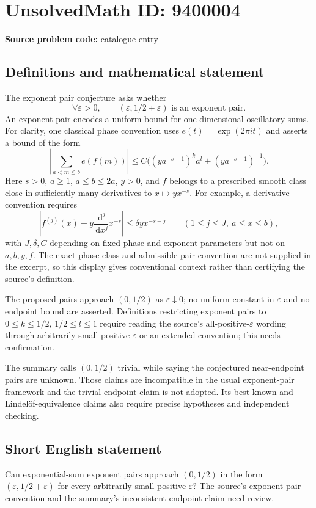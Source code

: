 \documentclass[11pt]{article}
\newcommand{\dd}{\,\mathrm{d}}
\begin{document}
\section*{UnsolvedMath ID: 9400004}
\textbf{Source problem code:} catalogue entry
\subsection{Definitions and mathematical statement}
The exponent pair conjecture asks whether
\[
 \forall\varepsilon>0,\qquad (\varepsilon,1/2+\varepsilon)
 \text{ is an exponent pair}.
\]
An exponent pair encodes a uniform bound for one-dimensional oscillatory sums. For clarity, one classical phase convention uses \(e(t)=\exp(2\pi i t)\) and asserts a bound of the form
\[
 \left|\sum_{a<m\leq b}e(f(m))\right|
 \leq C\bigl((ya^{-s-1})^k a^l+(ya^{-s-1})^{-1}\bigr).
\]
Here \(s>0\), \(a\geq1\), \(a\leq b\leq2a\), \(y>0\), and \(f\) belongs to a prescribed smooth class close in sufficiently many derivatives to \(x\mapsto yx^{-s}\). For example, a derivative convention requires
\[
 \left|f^{(j)}(x)-y\frac{\dd^j}{\dd x^j}x^{-s}\right|
 \leq\delta yx^{-s-j}\qquad(1\leq j\leq J,\ a\leq x\leq b),
\]
with \(J,\delta,C\) depending on fixed phase and exponent parameters but not on \(a,b,y,f\). The exact phase class and admissible-pair convention are not supplied in the excerpt, so this display gives conventional context rather than certifying the source's definition.

The proposed pairs approach \((0,1/2)\) as \(\varepsilon\downarrow0\); no uniform constant in \(\varepsilon\) and no endpoint bound are asserted. Definitions restricting exponent pairs to \(0\leq k\leq1/2\), \(1/2\leq l\leq1\) require reading the source's all-positive-\(\varepsilon\) wording through arbitrarily small positive \(\varepsilon\) or an extended convention; this needs confirmation.

The summary calls \((0,1/2)\) trivial while saying the conjectured near-endpoint pairs are unknown. Those claims are incompatible in the usual exponent-pair framework and the trivial-endpoint claim is not adopted. Its best-known and Lindel\"of-equivalence claims also require precise hypotheses and independent checking.
\subsection{Short English statement}
Can exponential-sum exponent pairs approach \((0,1/2)\) in the form \((\varepsilon,1/2+\varepsilon)\) for every arbitrarily small positive \(\varepsilon\)? The source's exponent-pair convention and the summary's inconsistent endpoint claim need review.
\end{document}
